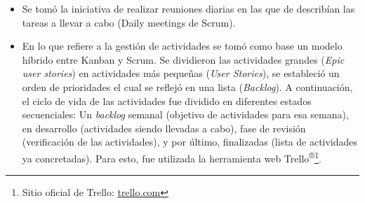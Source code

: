         \begin{itemize}
            \item Se tomó la iniciativa de realizar reuniones diarias en las que de describían las tareas a llevar a cabo (Daily meetings de Scrum).

            
            \item En lo que refiere a la gestión de actividades se tomó como base un modelo híbrido entre Kanban y Scrum. Se dividieron las actividades grandes (\textit{Epic user stories}) en actividades más pequeñas (\textit{User Stories}), se estableció un orden de prioridades el cual se reflejó en una lista (\textit{Backlog}). A continuación, el ciclo de vida de las actividades fue dividido en diferentes estados secuenciales: Un \textit{backlog} semanal (objetivo de actividades para esa semana), en desarrollo (actividades siendo llevadas a cabo), fase de revisión (verificación de las actividades), y por último, finalizadas (lista de actividades ya concretadas). Para esto, fue utilizada la herramienta web Trello\textsuperscript{®}\footnote{ Sitio oficial de Trello: \url{trello.com}}.
            
        \end{itemize}
        
